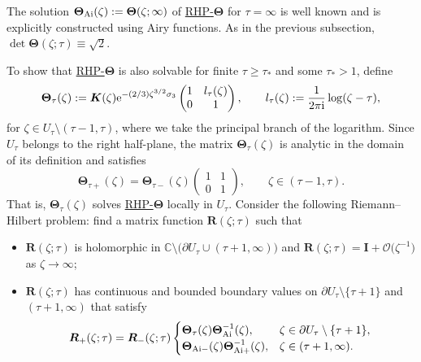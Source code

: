 \documentclass[pdftex]{sigma}
\numberwithin{equation}{section}
\newcommand{\C}		{\mathbb{C}}
\renewcommand{\det}{\operatorname{det}}
\newcommand{\ic}{\mathrm{i}}
\newcommand{\rhth} {\textnormal{RHP}-${\boldsymbol \Theta}$}
\begin{document}
The solution $ \boldsymbol\Theta_{\rm Ai}(\zeta) := \boldsymbol\Theta(\zeta;\infty) $ of \hyperref[rhth]{\rhth} for $ \tau=\infty $ is well known \cite{DKMLVZ99b} and is explicitly constructed using Airy functions. As in the previous subsection, $ \det \boldsymbol\Theta(\zeta;\tau) \equiv \sqrt 2 $.

To show that \hyperref[rhth]{\rhth} is also solvable for finite $ \tau\geq\tau_* $ and some $ \tau_*>1 $, define
\[
\boldsymbol\Theta_\tau(\zeta) := \boldsymbol K(\zeta) {\rm e}^{-(2/3)\zeta^{3/2}\sigma_3} \begin{pmatrix} 1 & l_\tau(\zeta) \\ 0 & 1 \end{pmatrix}, \qquad l_\tau(\zeta) := \frac1{2\pi\ic} \log(\zeta-\tau),
\]
for $ \zeta\in U_\tau\setminus(\tau-1,\tau) $, where we take the principal branch of the logarithm. Since $ U_\tau $ belongs to the right half-plane, the matrix $ \boldsymbol\Theta_\tau(\zeta) $ is analytic in the domain of its definition and satisfies
\[
\boldsymbol\Theta_{\tau+}(\zeta) = \boldsymbol\Theta_{\tau-}(\zeta) \begin{pmatrix} 1 & 1 \\ 0 & 1 \end{pmatrix}, \qquad \zeta\in(\tau-1,\tau).
\]
That is, $ \boldsymbol\Theta_\tau(\zeta) $ solves \hyperref[rhth]{\rhth} locally in $ U_\tau $. Consider the following Riemann--Hilbert problem: find a matrix function $ \boldsymbol R(\zeta;\tau) $ such that
\begin{itemize}\itemsep=0pt
\item[(a)] $\boldsymbol R(\zeta;\tau)$ is holomorphic in $ \C\setminus \bigl(\partial U_\tau \cup (\tau+1,\infty)\bigr) $ and $ \boldsymbol R(\zeta;\tau) = \boldsymbol I + \boldsymbol{\mathcal O}\bigl(\zeta^{-1}\bigr) $ as $ \zeta\to\infty $;
\item[(b)] $\boldsymbol R(\zeta;\tau)$ has continuous and bounded boundary values on $\partial U_\tau\setminus\{\tau+1\}$ and $ (\tau+1,\infty) $ that satisfy
\[
\boldsymbol R_+(\zeta;\tau) = \boldsymbol R_-(\zeta;\tau) \begin{cases}
\boldsymbol\Theta_\tau(\zeta)\boldsymbol\Theta_{\rm Ai}^{-1}(\zeta), & \zeta\in \partial U_\tau\setminus\{\tau+1\}, \\
\boldsymbol\Theta_{{\rm Ai}-}(\zeta)\boldsymbol\Theta_{{\rm Ai}+}^{-1}(\zeta), & \zeta\in(\tau+1,\infty).
\end{cases}
\]
\end{itemize}
\end{document}
